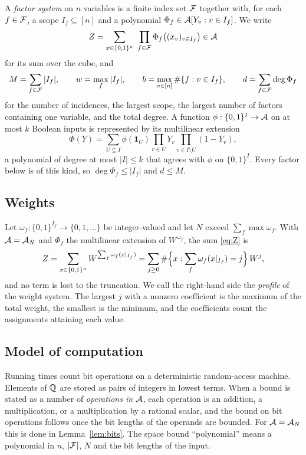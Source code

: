 A \emph{factor system} on $n$ variables is a finite index set $\mathcal{F}$ together with,
for each $f\in\mathcal{F}$, a scope $I_f\subseteq[n]$ and a polynomial
$\Phi_f\in\mathcal{A}[Y_v:v\in I_f]$. We write
\begin{equation}\label{eq:Z}
  Z=\sum_{x\in\{0,1\}^n}\ \prod_{f\in\mathcal{F}}\Phi_f\bigl((x_v)_{v\in I_f}\bigr)\in\mathcal{A}
\end{equation}
for its sum over the cube, and
\begin{equation}\label{eq:M}
  M=\sum_{f\in\mathcal{F}}|I_f|,\qquad w=\max_f|I_f|,\qquad b=\max_{v\in[n]}\#\{f:v\in I_f\},
  \qquad d=\sum_{f\in\mathcal{F}}\deg\Phi_f
\end{equation}
for the number of incidences, the largest scope, the largest number of factors
containing one variable, and the total degree. A function
$\phi:\{0,1\}^{I}\to\mathcal{A}$ on at most $k$ Boolean inputs is represented by its
multilinear extension
\begin{equation}\label{eq:multilinear}
  \Phi(Y)=\sum_{U\subseteq I}\phi(\mathbf 1_U)\prod_{v\in U}Y_v\prod_{v\in I\setminus U}(1-Y_v),
\end{equation}
a polynomial of degree at most $|I|\le k$ that agrees with $\phi$ on
$\{0,1\}^{I}$. Every factor below is of this kind, so $\deg\Phi_f\le |I_f|$ and
$d\le M$.

\subsection{Weights}
Let $\omega_f:\{0,1\}^{I_f}\to\{0,1,\dots\}$ be integer-valued and let $N$ exceed
$\sum_f\max \omega_f$. With $\mathcal{A}=\mathcal{A}_N$ and $\Phi_f$ the multilinear extension of
$W^{\,\omega_f}$, the sum \eqref{eq:Z} is
\begin{equation}\label{eq:profile}
  Z=\sum_{x\in\{0,1\}^n}W^{\sum_f \omega_f(x|_{I_f})}
   =\sum_{j\ge0}\#\Bigl\{x:\sum_f \omega_f(x|_{I_f})=j\Bigr\}\,W^{j},
\end{equation}
and no term is lost to the truncation. We call the right-hand side the
\emph{profile} of the weight system. The largest $j$ with a nonzero coefficient
is the maximum of the total weight, the smallest is the minimum, and the
coefficients count the assignments attaining each value.

\subsection{Model of computation}
Running times count bit operations on a deterministic random-access machine.
Elements of $\mathbb{Q}$ are stored as pairs of integers in lowest terms. When a bound is
stated as a number of \emph{operations in $\mathcal{A}$}, each operation is an addition,
a multiplication, or a multiplication by a rational scalar, and the bound on bit
operations follows once the bit lengths of the operands are bounded. For
$\mathcal{A}=\mathcal{A}_N$ this is done in Lemma~\ref{lem:bits}. The space bound ``polynomial''
means a polynomial in $n$, $|\mathcal{F}|$, $N$ and the bit lengths of the input.

